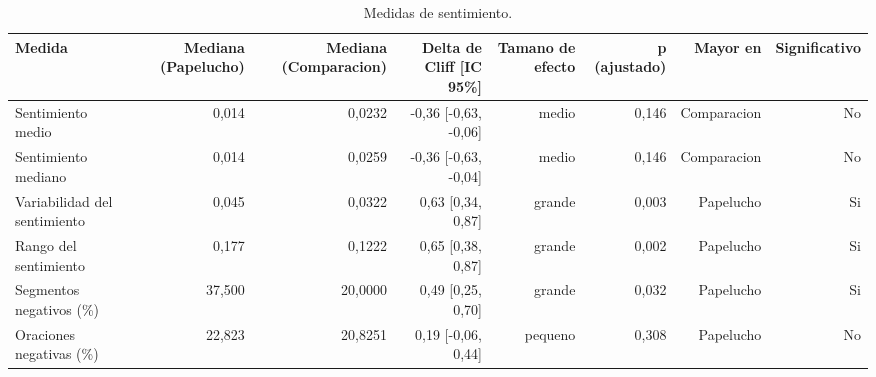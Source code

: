 \begin{table}[htbp]
\centering
\small
\caption{Medidas de sentimiento.}
\label{tab:sentiment-results-es}
\begin{tabular}{lrrrrrrr}
\toprule
\textbf{Medida} & \textbf{Mediana (Papelucho)} & \textbf{Mediana (Comparacion)} & \textbf{Delta de Cliff [IC 95\%]} & \textbf{Tamano de efecto} & \textbf{p (ajustado)} & \textbf{Mayor en} & \textbf{Significativo} \\
\midrule
Sentimiento medio & 0,014 & 0,0232 & -0,36 [-0,63, -0,06] & medio & 0,146 & Comparacion & No \\
Sentimiento mediano & 0,014 & 0,0259 & -0,36 [-0,63, -0,04] & medio & 0,146 & Comparacion & No \\
Variabilidad del sentimiento & 0,045 & 0,0322 & 0,63 [0,34, 0,87] & grande & 0,003 & Papelucho & Si \\
Rango del sentimiento & 0,177 & 0,1222 & 0,65 [0,38, 0,87] & grande & 0,002 & Papelucho & Si \\
Segmentos negativos (\%) & 37,500 & 20,0000 & 0,49 [0,25, 0,70] & grande & 0,032 & Papelucho & Si \\
Oraciones negativas (\%) & 22,823 & 20,8251 & 0,19 [-0,06, 0,44] & pequeno & 0,308 & Papelucho & No \\
\bottomrule
\end{tabular}
\end{table}


